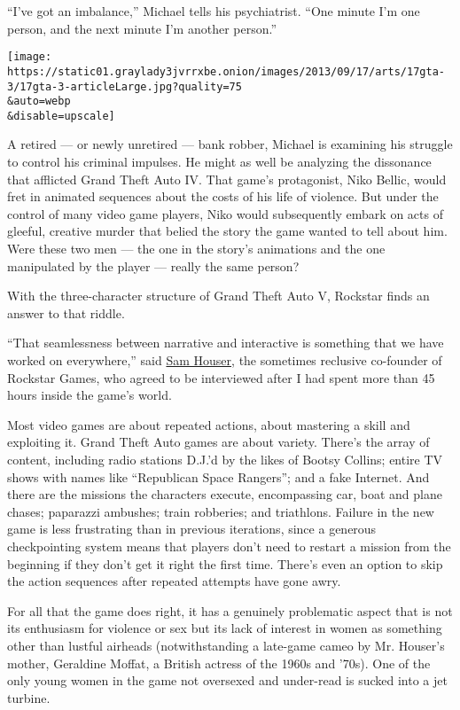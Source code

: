 ``I've got an imbalance,'' Michael tells his psychiatrist. ``One minute
I'm one person, and the next minute I'm another person.''

\texttt{[image: https://static01.graylady3jvrrxbe.onion/images/2013/09/17/arts/17gta-3/17gta-3-articleLarge.jpg?quality=75\\\&auto=webp\\\&disable=upscale]}

A retired --- or newly unretired --- bank robber, Michael is examining
his struggle to control his criminal impulses. He might as well be
analyzing the dissonance that afflicted Grand Theft Auto IV. That game's
protagonist, Niko Bellic, would fret in animated sequences about the
costs of his life of violence. But under the control of many video game
players, Niko would subsequently embark on acts of gleeful, creative
murder that belied the story the game wanted to tell about him. Were
these two men --- the one in the story's animations and the one
manipulated by the player --- really the same person?

With the three-character structure of Grand Theft Auto V, Rockstar finds
an answer to that riddle.

``That seamlessness between narrative and interactive is something that
we have worked on everywhere,'' said
\href{http://gta.wikia.com/Sam_Houser}{Sam Houser}, the sometimes
reclusive co-founder of Rockstar Games, who agreed to be interviewed
after I had spent more than 45 hours inside the game's world.

Most video games are about repeated actions, about mastering a skill and
exploiting it. Grand Theft Auto games are about variety. There's the
array of content, including radio stations D.J.'d by the likes of Bootsy
Collins; entire TV shows with names like ``Republican Space Rangers'';
and a fake Internet. And there are the missions the characters execute,
encompassing car, boat and plane chases; paparazzi ambushes; train
robberies; and triathlons. Failure in the new game is less frustrating
than in previous iterations, since a generous checkpointing system means
that players don't need to restart a mission from the beginning if they
don't get it right the first time. There's even an option to skip the
action sequences after repeated attempts have gone awry.

For all that the game does right, it has a genuinely problematic aspect
that is not its enthusiasm for violence or sex but its lack of interest
in women as something other than lustful airheads (notwithstanding a
late-game cameo by Mr. Houser's mother, Geraldine Moffat, a British
actress of the 1960s and '70s). One of the only young women in the game
not oversexed and under-read is sucked into a jet turbine.


